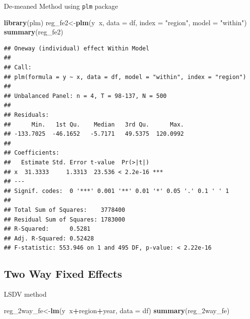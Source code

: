 \documentclass[]{book}
\newenvironment{Shaded}{\begin{snugshade}}{\end{snugshade}}
\newcommand{\KeywordTok}[1]{\textcolor[rgb]{0.13,0.29,0.53}{\textbf{#1}}}
\newcommand{\DataTypeTok}[1]{\textcolor[rgb]{0.13,0.29,0.53}{#1}}
\newcommand{\StringTok}[1]{\textcolor[rgb]{0.31,0.60,0.02}{#1}}
\newcommand{\OperatorTok}[1]{\textcolor[rgb]{0.81,0.36,0.00}{\textbf{#1}}}
\newcommand{\NormalTok}[1]{#1}
\theoremstyle{definition}
\theoremstyle{definition}
\theoremstyle{definition}
\theoremstyle{remark}
\begin{document}
De-meaned Method using \texttt{plm} package

\begin{Shaded}
\begin{Highlighting}[]
\KeywordTok{library}\NormalTok{(plm)}
\NormalTok{reg_fe2<-}\KeywordTok{plm}\NormalTok{(y}\OperatorTok{~}\NormalTok{x, }\DataTypeTok{data =}\NormalTok{ df, }\DataTypeTok{index =} \StringTok{"region"}\NormalTok{, }\DataTypeTok{model =} \StringTok{"within"}\NormalTok{)}
\KeywordTok{summary}\NormalTok{(reg_fe2)}
\end{Highlighting}
\end{Shaded}

\begin{verbatim}
## Oneway (individual) effect Within Model
## 
## Call:
## plm(formula = y ~ x, data = df, model = "within", index = "region")
## 
## Unbalanced Panel: n = 4, T = 98-137, N = 500
## 
## Residuals:
##      Min.   1st Qu.    Median   3rd Qu.      Max. 
## -133.7025  -46.1652   -5.7171   49.5375  120.0992 
## 
## Coefficients:
##   Estimate Std. Error t-value  Pr(>|t|)    
## x  31.3333     1.3313  23.536 < 2.2e-16 ***
## ---
## Signif. codes:  0 '***' 0.001 '**' 0.01 '*' 0.05 '.' 0.1 ' ' 1
## 
## Total Sum of Squares:    3778400
## Residual Sum of Squares: 1783000
## R-Squared:      0.5281
## Adj. R-Squared: 0.52428
## F-statistic: 553.946 on 1 and 495 DF, p-value: < 2.22e-16
\end{verbatim}

\subsection{Two Way Fixed Effects}\label{two-way-fixed-effects}

LSDV method

\begin{Shaded}
\begin{Highlighting}[]
\NormalTok{reg_2way_fe<-}\KeywordTok{lm}\NormalTok{(y}\OperatorTok{~}\NormalTok{x}\OperatorTok{+}\NormalTok{region}\OperatorTok{+}\NormalTok{year, }\DataTypeTok{data =}\NormalTok{ df)}
\KeywordTok{summary}\NormalTok{(reg_2way_fe)}
\end{Highlighting}
\end{Shaded}
\end{document}
